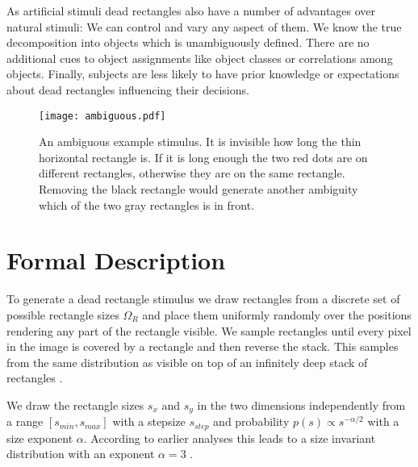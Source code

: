 \documentclass[10pt,letterpaper]{article}
\begin{document}
As artificial stimuli dead rectangles also have a number of advantages over natural stimuli: We can control and vary any aspect of them. We know the true decomposition into objects which is unambiguously defined. There are no additional cues to object assignments like object classes or correlations among objects. Finally, subjects are less likely to have prior knowledge or expectations about dead rectangles influencing their decisions. 

\begin{figure}
\begin{center}
\texttt{[image: ambiguous.pdf]}
\end{center}
\caption{An ambiguous example stimulus. It is invisible how long the thin horizontal rectangle is. If it is long enough the two red dots are on different rectangles, otherwise they are on the same rectangle. Removing the black rectangle would generate another ambiguity which of the two gray rectangles is in front.
\label{fig:ambiguous}}
\end{figure}

\section{Formal Description}
To generate a dead rectangle stimulus we draw rectangles from a discrete set of possible rectangle sizes $\Omega_R$ and place them uniformly randomly over the positions rendering any part of the rectangle visible. We sample rectangles until every pixel in the image is covered by a rectangle and then reverse the stack. This samples from the same distribution as visible on top of an infinitely deep stack of rectangles \cite{pitkow2010}.

We draw the rectangle sizes $s_x$ and $s_y$ in the two dimensions independently from a range $[s_{min},s_{max}]$ with a stepsize $s_{step}$ and probability $p(s)\propto s^{-{\alpha/2}}$ with a size exponent $\alpha$. According to earlier analyses this leads to a size invariant distribution with an exponent $\alpha=3$ \cite{lee2001}.
\end{document}
